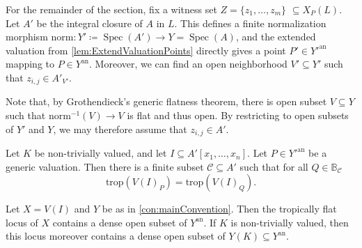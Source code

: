 \documentclass[10pt,a4paper]{amsart}
\DeclareMathOperator{\Spec}{Spec}
\newcommand{\an}{{\mathrm{an}}}
\begin{document}
\begin{assumption}
  \label{assumption:witnessSet}
  For the remainder of the section, fix a witness set $Z=\{z_1,\dots,z_m\}$ $\subseteq X_P(L)$.  Let $A'$ be the integral closure of $A$ in $L$. This defines a finite normalization morphism $\mathrm{norm}\colon Y'\coloneqq \Spec(A')\to Y=\Spec(A)$, and the extended valuation from \cref{lem:ExtendValuationPoints} directly gives a point $P'\in Y'^{\an}$ mapping to $P\in Y^{\an}$.  Moreover, we can find an open neighborhood $V'\subseteq Y'$ such that $z_{i,j}\in A'_{V'}$. %

  Note that, by Grothendieck's generic flatness theorem, there is open subset $V\subseteq Y$ such that $\mathrm{norm}^{-1}(V)\to V$ is flat and thus open.  By restricting to open subsets of $Y'$ and $Y$, we may therefore assume that $z_{i,j}\in A'$.
\end{assumption}

\begin{lemma}\label{lem:fiberwiseTropicalizationLocallyConstant}
  Let $K$ be non-trivially valued, and let $I\subseteq A'[x_1,\dots,x_n]$.  Let $P\in{Y'^{\mathrm{an}}}$ be a generic valuation. Then there is a finite subset $\mathcal{C}\subseteq A'$ such that for all $Q\in \mathbb{B}_{\mathcal{C}}$
  \begin{equation*}
    \mathrm{trop}(V(I)_{P})=\mathrm{trop}(V(I)_{Q}).
  \end{equation*}
\end{lemma}

\begin{theorem}\label{thm:TropicalGenericFlatness2}
  Let $X=V(I)$ and $Y$ be as in \cref{con:mainConvention}.
  Then the tropically flat locus of $X$ contains a dense open subset of $Y^{\mathrm{an}}$. If $K$ is non-trivially valued, then this locus moreover contains a dense open subset of $Y(K)\subseteq Y^\mathrm{an}$.
\end{theorem}
\end{document}
